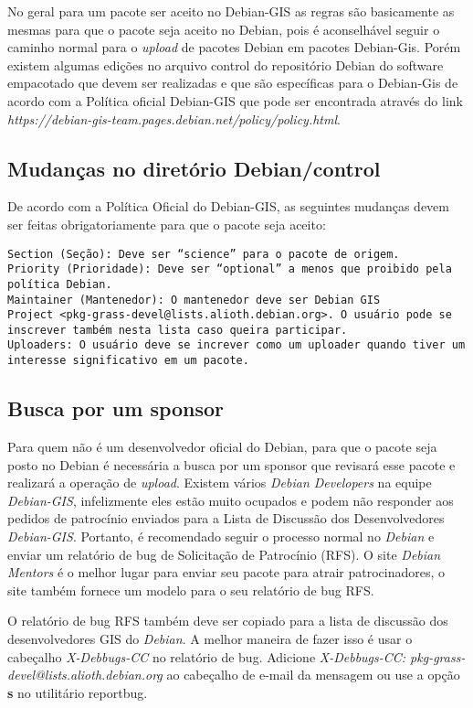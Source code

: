 No geral para um pacote ser aceito no Debian-GIS as regras são basicamente as mesmas para que o pacote seja aceito no Debian, pois é aconselhável seguir o caminho normal para o \textit{upload} de pacotes Debian em pacotes Debian-Gis. Porém existem algumas edições no arquivo control do repositório Debian do software empacotado que devem ser realizadas e que são específicas para o Debian-Gis de acordo com a Política oficial Debian-GIS que pode ser encontrada através do link \textit{https://debian-gis-team.pages.debian.net/policy/policy.html}.

\subsection{Mudanças no diretório Debian/control}
De acordo com a Política Oficial do Debian-GIS, as seguintes mudanças devem ser feitas obrigatoriamente para que o pacote seja aceito:
\begin{verbatim}
Section (Seção): Deve ser “science” para o pacote de origem.
Priority (Prioridade): Deve ser “optional” a menos que proibido pela política Debian.
Maintainer (Mantenedor): O mantenedor deve ser Debian GIS Project <pkg-grass-devel@lists.alioth.debian.org>. O usuário pode se inscrever também nesta lista caso queira participar.
Uploaders: O usuário deve se increver como um uploader quando tiver um interesse significativo em um pacote.
\end{verbatim}

\subsection{Busca por um sponsor}

Para quem não é um desenvolvedor oficial do Debian, para que o pacote seja posto no Debian é necessária a busca por um sponsor que revisará esse pacote e realizará a operação de \textit{upload}. Existem vários \textit{Debian Developers} na equipe \textit{Debian-GIS}, infelizmente eles estão muito ocupados e podem não responder aos pedidos de patrocínio enviados para a Lista de Discussão dos Desenvolvedores \textit{Debian-GIS}. Portanto, é recomendado seguir o processo normal no \textit{Debian} e enviar um relatório de bug de Solicitação de Patrocínio (RFS). O site \textit{Debian Mentors} é o melhor lugar para enviar seu pacote para atrair patrocinadores, o site também fornece um modelo para o seu relatório de bug RFS.

O relatório de bug RFS também deve ser copiado para a lista de discussão dos desenvolvedores GIS do \textit{Debian}. A melhor maneira de fazer isso é usar o cabeçalho\textit{ X-Debbugs-CC} no relatório de bug. Adicione \textit{X-Debbugs-CC: pkg-grass-devel@lists.alioth.debian.org} ao cabeçalho de e-mail da mensagem ou use a opção \textbf{s} no utilitário reportbug.
